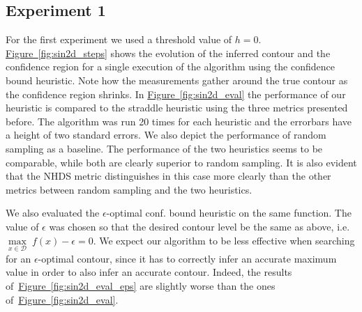 \documentclass[11pt]{article} %
\newcommand{\figref}[1]{\hyperref[#1]{\mbox{Figure~\ref*{#1}}}}
\begin{document}
\subsection{Experiment 1}
For the first experiment we used a threshold value of $h = 0$.
\figref{fig:sin2d_steps} shows the evolution of the inferred contour and the
confidence region for a single execution of the algorithm using the confidence
bound heuristic. Note how the measurements gather around the true contour
as the confidence region shrinks. In \figref{fig:sin2d_eval} the performance
of our heuristic is compared to the straddle heuristic using the three metrics
presented before. The algorithm was run 20 times for each heuristic and the
errorbars have a height of two standard errors. We also depict the performance
of random sampling as a baseline. The performance of the two heuristics seems
to be comparable, while both are
clearly superior to random sampling. It is also evident that the NHDS metric
distinguishes in this case more clearly than the other metrics between
random sampling and the two heuristics.

We also evaluated the $\epsilon$-optimal conf. bound heuristic on the same
function. The value of $\epsilon$ was chosen so that the desired contour
level be the same as above, i.e.
${\underset{x\in\mathcal{D}}{\max}\;f(x) - \epsilon = 0}$. We expect our algorithm
to be less effective when searching for an $\epsilon$-optimal contour, since
it has to correctly infer an accurate maximum value in order to also infer
an accurate contour. Indeed, the results of~\figref{fig:sin2d_eval_eps} are
slightly worse than the ones of~\figref{fig:sin2d_eval}.
\end{document}
